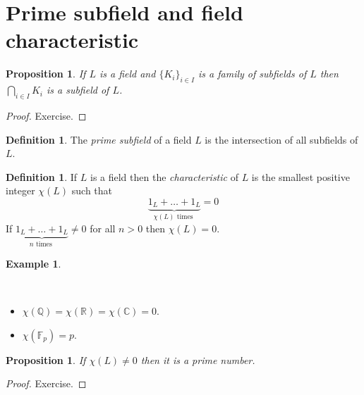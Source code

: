 \documentclass[12pt, letterpaper, oneside]{article}
\theoremstyle{plain}
\newtheorem{proposition}[theorem]{Proposition}
\theoremstyle{definition}
\newtheorem{definition}[theorem]{Definition}
\newtheorem{example}[theorem]{Example}
\newcommand{\Q}{{\mathbb Q}}
\newcommand{\R}{{\mathbb R}}
\newcommand{\C}{{\mathbb C}}
\newcommand{\F}{{\mathbb F}}
\newcommand{\bit}{\begin{itemize}}
\newcommand{\eit}{\end{itemize}}
\newcommand{\vs}{\vskip 5mm}
\begin{document}


\newpage
\section{Prime subfield and field characteristic}
\label{SEC_PRIMESUBFCHAR}


\begin{proposition}
If $L$ is a field and $\{K_{i}\}_{i\in I}$ is a family of subfields of $L$ then 
$\bigcap_{i\in I} K_{i}$ is a subfield of $L$. 
\end{proposition}

\vs

\begin{proof}
Exercise.
\end{proof}

\vs\vs

\begin{definition}
The \emph{prime subfield} of a field $L$ is the intersection of all subfields of $L$.
\end{definition}


\vs\vs

\begin{definition}
If $L$ is a field then the \emph{characteristic} of $L$ is the smallest positive integer 
$\chi(L)$ such that 
$$\underbrace{1_{L} + \dots + 1_{L}}_{\chi(L) \text{ times }} = 0$$
If $\underbrace{1_{L} + \dots + 1_{L}}_{n \text{ times }} \neq 0$ for all $n>0$ then
$\chi(L) = 0$.
\end{definition}

\vs\vs


\begin{example}\ 

\vskip -13mm

\ 
\bit
\item[] $\chi(\Q) = \chi(\R) = \chi(\C) = 0$.
\item[] $\chi(\F_{p}) = p$.
\eit
\end{example}



\vs\vs


\begin{proposition}
If $\chi(L)\neq 0$ then it is a prime number. 
\end{proposition}

\vs

\begin{proof}
Exercise.
\end{proof}
\end{document}
